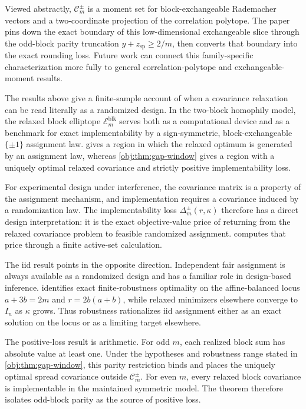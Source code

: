 \documentclass[11pt]{article}
\begin{document}
Viewed abstractly, \(\mathcal C_m^{\pm}\) is a moment set for block-exchangeable Rademacher vectors and a two-coordinate projection of the correlation polytope. The paper pins down the exact boundary of this low-dimensional exchangeable slice through the odd-block parity truncation \(y+z_{\mathrm{sp}}\ge 2/m\), then converts that boundary into the exact rounding loss. Future work can connect this family-specific characterization more fully to general correlation-polytope and exchangeable-moment results.

The results above give a finite-sample account of when a covariance relaxation can be read literally as a randomized design. In the two-block homophily model, the relaxed block elliptope \(\mathcal E_m^{\mathrm{blk}}\) serves both as a computational device and as a benchmark for exact implementability by a sign-symmetric, block-exchangeable \(\{\pm1\}\) assignment law.  gives a region in which the relaxed optimum is generated by an assignment law, whereas \cref{obj:thm:gap-window} gives a region with a uniquely optimal relaxed covariance and strictly positive implementability loss.

For experimental design under interference, the covariance matrix is a property of the assignment mechanism, and implementation requires a covariance induced by a randomization law. The implementability loss \(\Delta_m^{\pm}(r,\kappa)\) therefore has a direct design interpretation: it is the exact objective-value price of returning from the relaxed covariance problem to feasible randomized assignment.  computes that price through a finite active-set calculation.

The iid result points in the opposite direction. Independent fair assignment is always available as a randomized design and has a familiar role in design-based inference.  identifies exact finite-robustness optimality on the affine-balanced locus \(a+3b=2m\) and \(r=2b(a+b)\), while relaxed minimizers elsewhere converge to \(I_n\) as \(\kappa\) grows. Thus robustness rationalizes iid assignment either as an exact solution on the locus or as a limiting target elsewhere.

The positive-loss result is arithmetic. For odd \(m\), each realized block sum has absolute value at least one. Under the hypotheses and robustness range stated in \cref{obj:thm:gap-window}, this parity restriction binds and places the uniquely optimal spread covariance outside \(\mathcal C_m^{\pm}\). For even \(m\), every relaxed block covariance is implementable in the maintained symmetric model. The theorem therefore isolates odd-block parity as the source of positive loss.
\end{document}

